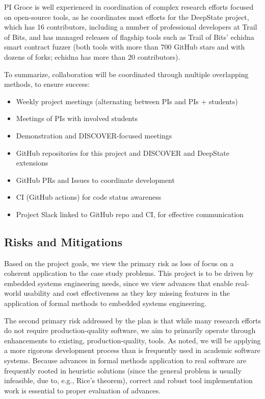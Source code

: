 \documentclass[12pt]{article}
\begin{document}
PI Groce is well experienced in coordination of complex research efforts focused on open-source tools, as he coordinates most efforts for the DeepState project, which has 16 contributors, including a number of professional developers at Trail of Bits, and has managed releases of flagship tools such as Trail of Bits' echidna smart contract fuzzer (both tools with more than 700 GitHub stars and with dozens of forks; echidna has more than 20 contributors).

To summarize, collaboration will be coordinated through multiple overlapping methods, to ensure success:
\begin{itemize}
\item Weekly project meetings (alternating between PIs and PIs + students)
\item Meetings of PIs with involved students
\item Demonstration and DISCOVER-focused meetings
\item GitHub repositories for this project and DISCOVER and DeepState extensions
\item GitHub PRs and Issues to coordinate development
\item CI (GitHub actions) for code status awareness
\item Project Slack linked to GitHub repo and CI, for effective communication
\end{itemize}


\subsection{Risks and Mitigations}

Based on the project goals, we view the primary risk as loss of focus on a coherent application to the case study problems.  This project is to be driven by embedded systems engineering needs, since we view advances that enable real-world usability and cost effectiveness as they key missing features in the application of formal methods to embedded systems engineering.  

The second primary risk addressed by the plan is that while many research efforts do not require production-quality software, we aim to primarily operate through enhancements to existing, production-quality, tools.  As noted, we will be applying a more rigorous development process than is frequently used in academic software systems.  Because advances in formal methods application to real software are frequently rooted in heuristic solutions (since the general problem is usually infeasible, due to, e.g., Rice's theorem), correct and robust tool implementation work is essential to proper evaluation of advances.
\end{document}
